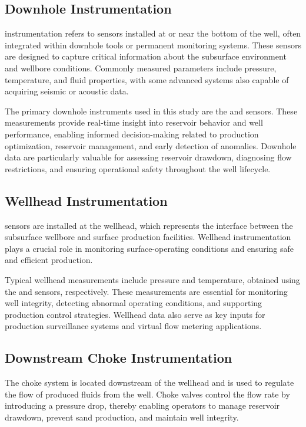 \documentclass[12pt,APA]{uomthesis}
\begin{document}
\subsection{Downhole Instrumentation}
 instrumentation refers to sensors installed at or near the bottom of the well, often integrated within downhole tools or permanent monitoring systems. These sensors are designed to capture critical information about the subsurface environment and wellbore conditions. Commonly measured parameters include pressure, temperature, and fluid properties, with some advanced systems also capable of acquiring seismic or acoustic data.

The primary downhole instruments used in this study are the  and  sensors. These measurements provide real-time insight into reservoir behavior and well performance, enabling informed decision-making related to production optimization, reservoir management, and early detection of anomalies. Downhole data are particularly valuable for assessing reservoir drawdown, diagnosing flow restrictions, and ensuring operational safety throughout the well lifecycle.
\subsection{Wellhead Instrumentation}

 sensors are installed at the wellhead, which represents the interface between the subsurface wellbore and surface production facilities. Wellhead instrumentation plays a crucial role in monitoring surface-operating conditions and ensuring safe and efficient production.

Typical wellhead measurements include pressure and temperature, obtained using the  and  sensors, respectively. These measurements are essential for monitoring well integrity, detecting abnormal operating conditions, and supporting production control strategies. Wellhead data also serve as key inputs for production surveillance systems and virtual flow metering applications.

\subsection{Downstream Choke Instrumentation}
The choke system is located downstream of the wellhead and is used to regulate the flow of produced fluids from the well. Choke valves control the flow rate by introducing a pressure drop, thereby enabling operators to manage reservoir drawdown, prevent sand production, and maintain well integrity.
\end{document}
